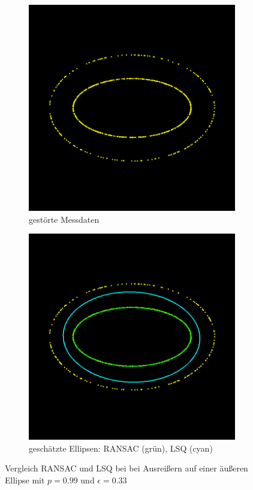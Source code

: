 {\begin{figure}[!htb]
	\begin{subfigure}{.5\textwidth}
		\centering
		\includegraphics[width=.9\textwidth]{images/ransacShadow33_0.png}
		\caption{gestörte Messdaten}
		\label{fig:nonmUniformRansa1}
	\end{subfigure}%
	\begin{subfigure}{.5\textwidth}
		\centering
		\includegraphics[width=.9\textwidth]{images/ransacShadow33_1.png}
		\caption{geschätzte Ellipsen: RANSAC (grün), LSQ (cyan)}
		\label{fig:nonmUniformRansac2}
	\end{subfigure}
	\caption{Vergleich RANSAC und LSQ bei bei Ausreißern auf einer äußeren Ellipse mit $p = 0.99$ und $\epsilon = 0.33$}
	\label{fig:nonmUniformRansac}
\end{figure}


}
